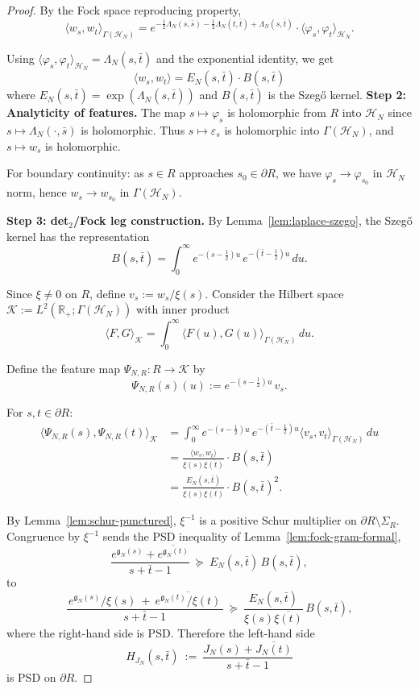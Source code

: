 \documentclass[11pt]{article}
\theoremstyle{definition}
\theoremstyle{remark}
\begin{document}
\begin{proof}
By the Fock space reproducing property,
\[
  \langle w_s, w_t \rangle_{\Gamma(\mathcal{H}_N)} = e^{-\frac{1}{2}\Lambda_N(s,\bar s) - \frac{1}{2}\Lambda_N(t,\bar t) + \Lambda_N(s,\bar t)} \cdot \langle \varphi_s, \varphi_t \rangle_{\mathcal{H}_N}.
\]

Using $\langle \varphi_s, \varphi_t \rangle_{\mathcal{H}_N} = \Lambda_N(s,\bar t)$ and the exponential identity, we get
\[
  \langle w_s, w_t \rangle = E_N(s,\bar t) \cdot B(s,\bar t)
\]
where $E_N(s,\bar t) = \exp(\Lambda_N(s,\bar t))$ and $B(s,\bar t)$ is the Szegő kernel.
\medskip
\noindent\textbf{Step 2: Analyticity of features.}
The map $s \mapsto \varphi_s$ is holomorphic from $R$ into $\mathcal{H}_N$ since $s \mapsto \Lambda_N(\cdot, \bar s)$ is holomorphic. Thus $s \mapsto \varepsilon_s$ is holomorphic into $\Gamma(\mathcal{H}_N)$, and $s \mapsto w_s$ is holomorphic.

For boundary continuity: as $s \in R$ approaches $s_0 \in \partial R$, we have $\varphi_s \to \varphi_{s_0}$ in $\mathcal{H}_N$ norm, hence $w_s \to w_{s_0}$ in $\Gamma(\mathcal{H}_N)$.

\medskip
\noindent\textbf{Step 3: det$_2$/Fock leg construction.}
By Lemma~\ref{lem:laplace-szego}, the Szegő kernel has the representation
\[
  B(s,\bar t) = \int_0^\infty e^{-(s-\frac{1}{2})u} \, e^{-(\bar t - \frac{1}{2})u} \, du.
\]

Since $\xi \neq 0$ on $R$, define $v_s := w_s / \xi(s)$. Consider the Hilbert space $\mathcal{K} := L^2(\mathbb{R}_+; \Gamma(\mathcal{H}_N))$ with inner product
\[
  \langle F, G \rangle_{\mathcal{K}} = \int_0^\infty \langle F(u), G(u) \rangle_{\Gamma(\mathcal{H}_N)} \, du.
\]

Define the feature map $\Psi_{N,R}: R \to \mathcal{K}$ by
\[
  \Psi_{N,R}(s)(u) := e^{-(s-\frac{1}{2})u} \, v_s.
\]

For $s,t \in \partial R$:
\begin{align}
  \langle \Psi_{N,R}(s), \Psi_{N,R}(t) \rangle_{\mathcal{K}} 
  &= \int_0^\infty e^{-(s-\frac{1}{2})u} \, e^{-(\bar t - \frac{1}{2})u} \langle v_s, v_t \rangle_{\Gamma(\mathcal{H}_N)} \, du\\
  &= \frac{\langle w_s, w_t \rangle}{\xi(s)\overline{\xi(t)}} \cdot B(s,\bar t)\\
  &= \frac{E_N(s,\bar t)}{\xi(s)\overline{\xi(t)}} \cdot B(s,\bar t)^2.
\end{align}

By Lemma~\ref{lem:schur-punctured}, \(\xi^{-1}\) is a positive Schur multiplier on \(\partial R \setminus \Sigma_R\). Congruence by \(\xi^{-1}\) sends the PSD inequality of Lemma~\ref{lem:fock-gram-formal},
\[
  \frac{e^{\mathfrak g_N(s)}+\overline{e^{\mathfrak g_N(t)}}}{s+\bar t-1}\ \succeq\ E_N(s,\bar t)\,B(s,\bar t),
\]
to
\[
  \frac{\,e^{\mathfrak g_N(s)}/\xi(s)\ +\ \overline{e^{\mathfrak g_N(t)}/\xi(t)}\,}{s+\bar t-1}\ \succeq\ \frac{E_N(s,\bar t)}{\xi(s)\overline{\xi(t)}}\,B(s,\bar t),
\]
where the right-hand side is PSD. Therefore the left-hand side
\[
  H_{J_N}(s,\bar t)\ :=\ \frac{J_N(s)+\overline{J_N(t)}}{s+\bar t-1}
\]
is PSD on \(\partial R\).


\end{proof}
\end{document}
